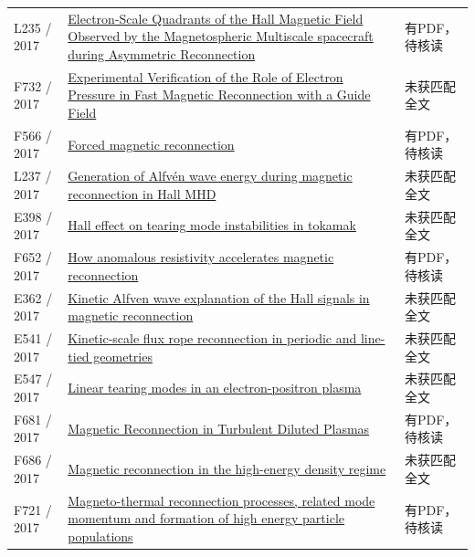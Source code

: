 \begin{longtable}{P{24mm}P{97mm}P{27mm}}
L235 / 2017 & \href{https://doi.org/10.1103/physrevlett.118.175101}{Electron-Scale Quadrants of the Hall Magnetic Field Observed by the Magnetospheric Multiscale spacecraft during Asymmetric Reconnection} & 有PDF，待核读\\

F732 / 2017 & \href{https://doi.org/10.1103/physrevlett.118.125002}{Experimental Verification of the Role of Electron Pressure in Fast Magnetic Reconnection with a Guide Field} & 未获匹配全文\\

F566 / 2017 & \href{https://doi.org/10.1017/s0022377817000782}{Forced magnetic reconnection} & 有PDF，待核读\\

L237 / 2017 & \href{https://doi.org/10.1088/2058-6272/aa7c17}{Generation of Alfvén wave energy during magnetic reconnection in Hall MHD} & 未获匹配全文\\

E398 / 2017 & \href{https://doi.org/10.1063/1.5004430}{Hall effect on tearing mode instabilities in tokamak} & 未获匹配全文\\

F652 / 2017 & \href{https://doi.org/10.1063/1.5000071}{How anomalous resistivity accelerates magnetic reconnection} & 有PDF，待核读\\

E362 / 2017 & \href{http://ui.adsabs.harvard.edu/abs/2017AGUFMSM13B2376D/abstract}{Kinetic Alfven wave explanation of the Hall signals in magnetic reconnection} & 未获匹配全文\\

E541 / 2017 & \href{https://doi.org/10.1063/1.5007860}{Kinetic-scale flux rope reconnection in periodic and line-tied geometries} & 未获匹配全文\\

E547 / 2017 & \href{https://doi.org/10.1088/2058-6272/aa5801}{Linear tearing modes in an electron-positron plasma} & 未获匹配全文\\

F681 / 2017 & \href{https://doi.org/10.48550/arxiv.1703.01238}{Magnetic Reconnection in Turbulent Diluted Plasmas} & 有PDF，待核读\\

F686 / 2017 & \href{https://doi.org/10.1088/1361-6587/aa6803}{Magnetic reconnection in the high-energy density regime} & 未获匹配全文\\

F721 / 2017 & \href{https://doi.org/10.1088/1741-4326/aa6c70}{Magneto-thermal reconnection processes,  related mode momentum and formation of high energy particle populations} & 有PDF，待核读\\


\end{longtable}
